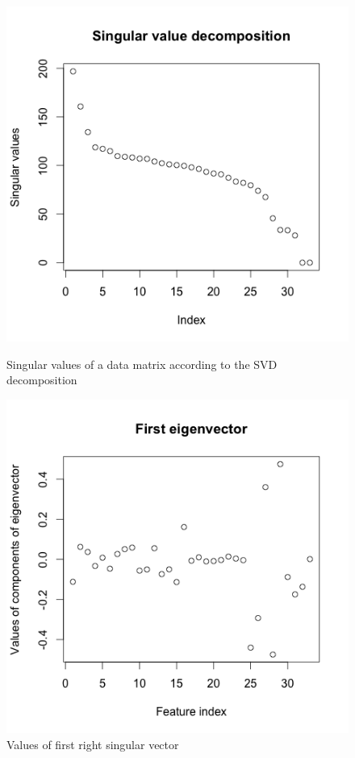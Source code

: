 \begin{figure}[h!]
\centering
\begin{minipage}[h]{0.45\linewidth}
\includegraphics[width=1\linewidth]{images/svd_for_pca}
\caption{Singular values of a data matrix according to the SVD decomposition}
\label{fig:svd_for_pca}
\end{minipage}
\hfill
\begin{minipage}[h]{0.45\linewidth}
	\centering
	\includegraphics[width=1.00\linewidth]{images/svd_eigenvector}
	\caption{Values of first right singular vector}
	\label{fig:svd_eigenvector}
\end{minipage}
\end{figure}


